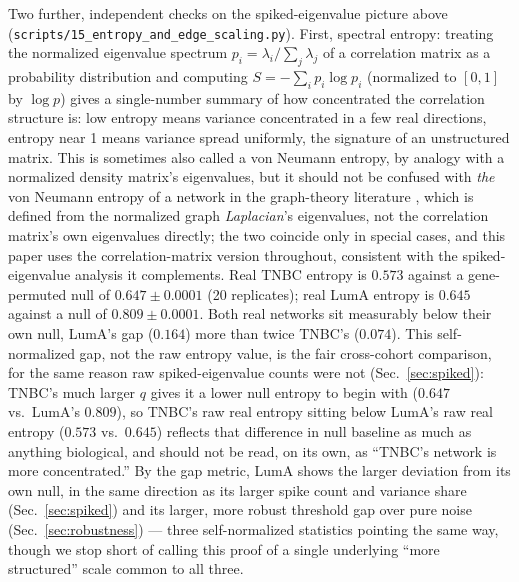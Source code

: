 \documentclass[11pt]{article}
\begin{document}
Two further, independent checks on the spiked-eigenvalue picture above
(\texttt{scripts/15\_entropy\_and\_edge\_scaling.py}). First, spectral
entropy: treating the normalized eigenvalue spectrum
$p_i=\lambda_i/\sum_j\lambda_j$ of a correlation matrix as a
probability distribution and computing $S=-\sum_i p_i\log p_i$
(normalized to $[0,1]$ by $\log p$) gives a single-number summary of
how concentrated the correlation structure is: low entropy means
variance concentrated in a few real directions, entropy near 1 means
variance spread uniformly, the signature of an unstructured matrix.
This is sometimes also called a von Neumann entropy, by analogy with a
normalized density matrix's eigenvalues, but it should not be confused
with \emph{the} von Neumann entropy of a network in the graph-theory
literature \citep{passeriniseverini2009}, which is defined from the
normalized graph \emph{Laplacian}'s eigenvalues, not the correlation
matrix's own eigenvalues directly; the two coincide only in special
cases, and this paper uses the correlation-matrix version throughout,
consistent with the spiked-eigenvalue analysis it complements.
Real TNBC entropy is $0.573$ against a gene-permuted null of
$0.647\pm0.0001$ (20 replicates); real LumA entropy is $0.645$ against
a null of $0.809\pm0.0001$. Both real networks sit measurably below
their own null, LumA's gap ($0.164$) more than twice TNBC's ($0.074$).
This self-normalized gap, not the raw entropy value, is the fair
cross-cohort comparison, for the same reason raw spiked-eigenvalue
counts were not (Sec.~\ref{sec:spiked}): TNBC's much larger $q$ gives
it a lower null entropy to begin with ($0.647$ vs.\ LumA's $0.809$),
so TNBC's raw real entropy sitting below LumA's raw real entropy
($0.573$ vs.\ $0.645$) reflects that difference in null baseline as
much as anything biological, and should not be read, on its own, as
``TNBC's network is more concentrated.'' By the gap metric, LumA shows
the larger deviation from its own null, in the same direction as its
larger spike count and variance share (Sec.~\ref{sec:spiked}) and its
larger, more robust threshold gap over pure noise
(Sec.~\ref{sec:robustness}) --- three self-normalized statistics
pointing the same way, though we stop short of calling this proof of a
single underlying ``more structured'' scale common to all three.
\end{document}
